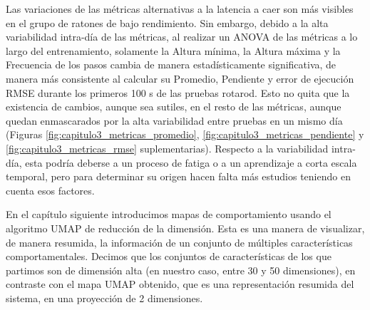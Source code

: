 Las variaciones de las métricas alternativas a la latencia a caer son más visibles en el grupo de ratones de bajo rendimiento. Sin embargo, debido a la alta variabilidad intra-día de las métricas, al realizar un ANOVA de las métricas a lo largo del entrenamiento, solamente la Altura mínima, la Altura máxima y la Frecuencia de los pasos cambia de manera estadísticamente significativa, de manera más consistente al calcular su Promedio, Pendiente y error de ejecución RMSE durante los primeros 100 s de las pruebas rotarod. Esto no quita que la existencia de cambios, aunque sea sutiles, en el resto de las métricas, aunque quedan enmascarados por la alta variabilidad entre pruebas en un mismo día (Figuras \ref{fig:capitulo3_metricas_promedio}, \ref{fig:capitulo3_metricas_pendiente} y \ref{fig:capitulo3_metricas_rmse} suplementarias). Respecto a la variabilidad intra-día, esta podría deberse a un proceso de fatiga o a un aprendizaje a corta escala temporal, pero para determinar su origen hacen falta más estudios teniendo en cuenta esos factores.

En el capítulo siguiente introducimos mapas de comportamiento usando el algoritmo UMAP de reducción de la dimensión. Esta es una manera de visualizar, de manera resumida, la información de un conjunto de múltiples características comportamentales. Decimos que los conjuntos de características de los que partimos son de dimensión alta (en nuestro caso, entre 30 y 50 dimensiones), en contraste con el mapa UMAP obtenido, que es una representación resumida del sistema, en una proyección de 2 dimensiones.

